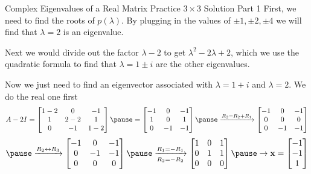 \documentclass[xcoler=dvipsnames, aspectratio=169]{beamer}
\begin{document}
    \begin{frame}{Complex Eigenvalues of a Real Matrix Practice $3\times 3$ Solution Part 1}
        \small
        First, we need to find the roots of $p(\lambda)$. By plugging in the values of 
        $\pm1,\pm2,\pm4$ we will find that $\lambda=2$ is an eigenvalue. 

        \vspace{10pt}
        Next we would divide out the
        factor $\lambda-2$ to get $\lambda^2 -2\lambda + 2$, which we use the quadratic formula to find
        that $\lambda=1\pm i$ are the other eigenvalues.

        \vspace{10pt}
        Now we just need to find an eigenvector associated with $\lambda=1+i$ and $\lambda=2$. We
        do the real one first
        \[
            A-2I = \bMat{
                1-2 & 0 & -1\\
                1 & 2-2 &  1\\
                0 & -1 & 1-2
            }\pause = \bMat{
                -1 & 0 & -1\\
                1 & 0 & 1\\
                0 & -1 & -1
            }\pause\xrightarrow{R_2=R_2+R_1}\bMat{
                -1 & 0 & -1\\
                0 & 0 & 0\\
                0 & -1 & -1
            }
        \]
        \[
            \pause\xrightarrow{R_2\leftrightarrow R_3}\bMat{
                -1 & 0 & -1\\
                0 & -1 & -1\\
                0 & 0 & 0
            }\pause\xrightarrow[R_2=-R_2]{R_1=-R_1}\bMat{
                1 & 0 & 1\\
                0 & 1 & 1\\
                0 & 0 & 0
            }\pause\rightarrow\vec{x} = \bMat{-1\\-1\\1}
        \]
    \end{frame}
\end{document}
